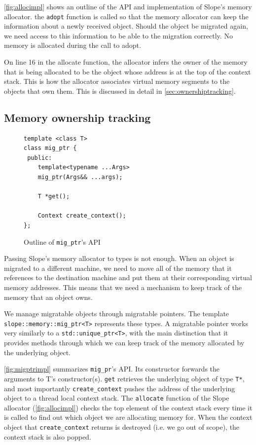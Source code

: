 \autoref{fig:allocimpl} shows an outline of the API and implementation of Slope's
memory allocator. the \texttt{adopt} function is called so that the memory
allocator can keep the information about a newly received object.
Should the object be migrated again, we need access to this information
to be able to the migration correctly. No memory is allocated during the call
to adopt.

On line 16 in the allocate function, the allocator infers
the owner of the memory that is being allocated to be the object whose
address is at the top of the context stack. This is how the allocator
associates virtual memory segments to the objects that own them. This is
discussed in detail in \autoref{sec:ownershiptracking}.



\subsection{Memory ownership tracking}
\label{sec:ownershiptracking}

\begin{figure}[tp]
\begin{lstlisting}
template <class T>
class mig_ptr {
 public:
    template<typename ...Args>
    mig_ptr(Args&& ...args);

    T *get();

    Context create_context();
};
\end{lstlisting}
    \caption{ Outline of \texttt{mig\_ptr}'s API }
\label{fig:migptrimpl}
\end{figure}


Passing Slope's memory allocator to types is not enough.
When an object is migrated to a different machine, we need to move all of the
memory that it references to the destination machine and put them at their
corresponding virtual memory addresses. This means
that we need a mechanism to keep track of the memory that an object owns.


We manage migratable objects through migratable pointers. The template\\
\texttt{slope::memory::mig\_ptr<T>} represents these types. A migratable
pointer works very similarly to a \texttt{std::unique\_ptr<T>}, with the
main distinction that it provides methods through which we can keep track
of the memory allocated by the underlying object.


\autoref{fig:migptrimpl} summarizes \texttt{mig\_pr}'s API. Its
constructor forwards the arguments to
T's constructor(s). \texttt{get} retrieves the underlying object of
type \texttt{T*}, and most importantly \texttt{create\_context}
pushes the address of the underlying object to a thread local context stack.
The \texttt{allocate} function of the Slope allocator (\autoref{fig:allocimpl})
checks the top element of the context stack every time it is called to find out
which object we are allocating memory for. When the context object that
\texttt{create\_context} returns is destroyed (i.e. we go out of scope), the
context stack is also popped.


